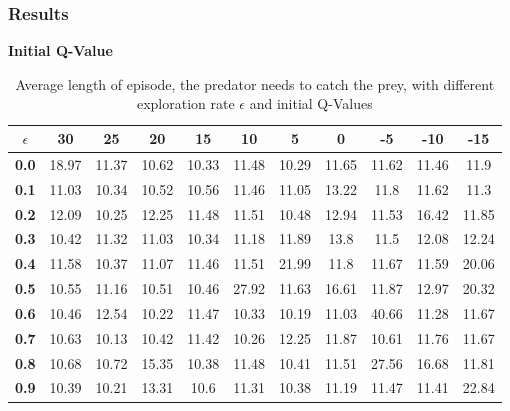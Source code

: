 \documentclass[11pt]{article}
\begin{document}
\subsubsection{Results}
\begin{center}
\begin{table*}[ht]
{\small
\hfill{}
\begin{center}
\textbf{Initial Q-Value}\\
\end{center}
\begin{tabular}{c|c|c|c|c|c|c|c|c|c|c}
\textbf{$\epsilon$} & \textbf{30} & \textbf{25} & \textbf{20} & \textbf{15} & \textbf{10} & \textbf{5} & \textbf{0} & \textbf{-5} & \textbf{-10}& \textbf{-15}\\
	\hline
\textbf{0.0} & 18.97 & 11.37 & 10.62 & 10.33 & 11.48 & 10.29 & 11.65 & 11.62 & 11.46 & 11.9\\
\textbf{0.1} & 11.03 & 10.34 & 10.52 & 10.56 & 11.46 & 11.05 & 13.22 & 11.8 & 11.62 & 11.3\\
\textbf{0.2} & 12.09 & 10.25 & 12.25 & 11.48 & 11.51 & 10.48 & 12.94 & 11.53 & 16.42 & 11.85\\
\textbf{0.3} & 10.42 & 11.32 & 11.03 & 10.34 & 11.18 & 11.89 & 13.8 & 11.5 & 12.08 & 12.24\\
\textbf{0.4} & 11.58 & 10.37 & 11.07 & 11.46 & 11.51 & 21.99 & 11.8 & 11.67 & 11.59 & 20.06\\
\textbf{0.5} & 10.55 & 11.16 & 10.51 & 10.46 & 27.92 & 11.63 & 16.61 & 11.87 & 12.97 & 20.32\\
\textbf{0.6} & 10.46 & 12.54 & 10.22 & 11.47 & 10.33 & 10.19 & 11.03 & 40.66 & 11.28 & 11.67\\
\textbf{0.7} & 10.63 & 10.13 & 10.42 & 11.42 & 10.26 & 12.25 & 11.87 & 10.61 & 11.76 & 11.67\\
\textbf{0.8} & 10.68 & 10.72 & 15.35 & 10.38 & 11.48 & 10.41 & 11.51 & 27.56 & 16.68 & 11.81\\
\textbf{0.9} & 10.39 & 10.21 & 13.31 & 10.6 & 11.31 & 10.38 & 11.19 & 11.47 & 11.41 & 22.84\\
\end{tabular}}
\hfill{}
\caption{Average length of episode, the predator needs to catch the prey, with different exploration rate $\epsilon$ and initial Q-Values}
\label{table:task1}
\end{table*}
\end{center}
\end{document}
